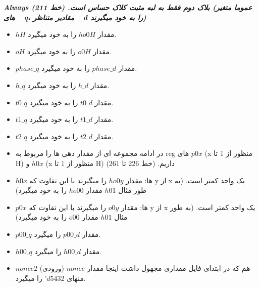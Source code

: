 \textit{\textbf{Always بلاک دوم فقط به لبه مثبت کلاک حساس است. (خط 211)
	(عموما متغیر های \_q، مقادیر متناظر \_d را به خود میگیرند) }}
\begin{itemize}
	\item
	      $hH$ مقدار $ho0H$ را به خود میگیرد.
	\item
	      $oH$ مقدار $o0H$ را به خود میگیرد.
	\item
	      $phase\_q$ مقدار $phase\_d$ را به خود میگیرد.
	\item
	      $h\_q$ مقدار $h\_d$ را به خود میگیرد.
	\item
	      $t0\_q$ مقدار $t0\_d$ را به خود میگیرد.
	\item
	      $t1\_q$ مقدار $t1\_d$ را به خود میگیرد.
	\item
	      $t2\_q$ مقدار $t2\_d$ را به خود میگیرد.
	\item
	      در ادامه مجموعه ای از مقدار دهی ها را مربوط به reg های $p0x$ (x منظور از 1  تا H) و $h0x$ (x منظور از   1  تا H) داریم. (خط 226 تا 261)
	\item
	      $h0x$ ها: مقدار $ho0y$ را میگیرند با این تفاوت که y از x یک واحد کمتر است. (به طور مثال $h01$ مقدار $ho00$ را به خود میگیرد)
	\item
	      $p0x$  ها: مقدار $o0y$ را میگیرند با این تفاوت که y از x یک واحد کمتر است. (به طور مثال $h01$ مقدار $o00$ را به خود میگیرد)
	\item
	      $p00\_q$ مقدار $p00\_d$ را میگیرد.
	\item
	      $h00\_q$ مقدار $h00\_d$ را میگیرد.
	\item
	      $nonce2$ هم که در ابتدای فایل مقداری مجهول داشت اینجا مقدار $nonce$ (ورودی)  منهای 32$’d54$
	       را میگیرد.
\end{itemize}